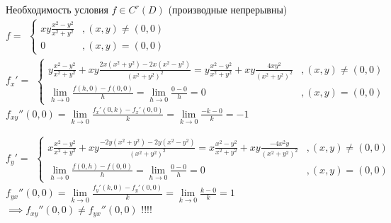 \begin{remark}
	
Необходимость условия $f \in C^r(D)$ (производные непрерывны)\\

$f = 
\begin{aligned}
\left\{
\begin{array}{ll}
xy\frac{x^2 - y^2}{x^2 + y^2} &, (x, y) \neq (0, 0) \\
0 &, (x, y) = (0, 0) 
\end{array}
\right.
\end{aligned}
$\\

$f_{x}' = 
\begin{aligned}
\left\{
\begin{array}{ll}
y\frac{x^2 - y^2}{x^2 + y^2} + xy\frac{2x(x^2 + y^2) - 2x (x^2 - y^2)}{(x^2 + y^2)^2} = y\frac{x^2 - y^2}{x^2 + y^2} + xy \frac{4xy^2}{(x^2 + y^2)^2} &, (x, y) \neq (0, 0) \\
\lim\limits_{h\to0}\frac{f(h, 0) - f(0, 0)}{h} = \lim\limits_{h\to0}\frac{0 - 0}{h} = 0 &, (x, y) = (0, 0) 
\end{array}
\right.
\end{aligned}
$\\

$
f_{xy}''(0, 0) = \lim\limits_{k\to0}\frac{f_{x}'(0, k) - f_{x}'(0, 0)}{k} = \lim\limits_{k\to0}\frac{-k - 0}{k} = -1
$

$f_{y}' = 
\begin{aligned}
\left\{
\begin{array}{ll}
x\frac{x^2 - y^2}{x^2 + y^2} + xy\frac{-2y(x^2 + y^2) - 2y (x^2 - y^2)}{(x^2 + y^2)^2} = x\frac{x^2 - y^2}{x^2 + y^2} + xy \frac{-4x^2y}{(x^2 + y^2)^2} &, (x, y) \neq (0, 0) \\
\lim\limits_{h\to0}\frac{f(0, h) - f(0, 0)}{h} = \lim\limits_{h\to0}\frac{0 - 0}{h} = 0 &, (x, y) = (0, 0) 
\end{array}
\right.
\end{aligned}
$\\

$
f_{yx}''(0, 0) = \lim\limits_{k\to0}\frac{f_{y}'(k, 0) - f_{y}'(0, 0)}{k} = \lim\limits_{k\to0}\frac{k - 0}{k} = 1
$\\

$\implies f_{xy}''(0, 0) \neq f_{yx}''(0, 0)$ !!!!


\end{remark}
